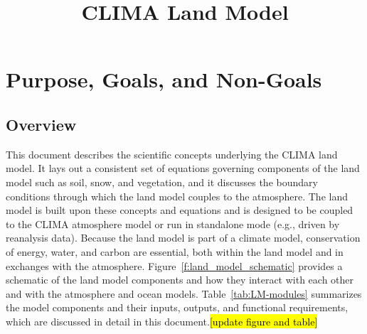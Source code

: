 \documentclass[twoside,10pt]{report}
\title{CLIMA Land Model}
\author{ }
\begin{document}
\maketitle
\tableofcontents

\chapter{Purpose, Goals, and Non-Goals}

\section{Overview}

This document describes the scientific concepts underlying the CLIMA land model. It lays out a consistent set of equations governing components of the land model such as soil, snow, and vegetation, and it discusses the boundary conditions through which the land model couples to the atmosphere. The land model is built upon these concepts and equations and is designed to be coupled to the CLIMA atmosphere model or run in standalone mode (e.g., driven by reanalysis data). Because the land model is part of a climate model, conservation of energy, water, and carbon are essential, both within the land model and in exchanges with the atmosphere. Figure~\ref{f:land_model_schematic} provides a schematic of the land model components and how they interact with each other and with the atmosphere and ocean models. Table~\ref{tab:LM-modules} summarizes the model components and their inputs, outputs, and functional requirements, which are discussed in detail in this document.\hl{[update figure and table]}
\end{document}
